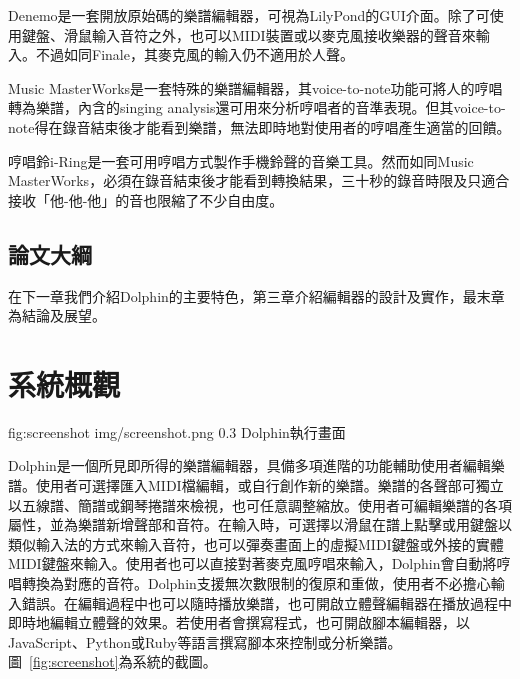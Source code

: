 \documentclass[12pt,a4paper,oneside]{report}
\begin{document}
Denemo\cite{denemo}是一套開放原始碼的樂譜編輯器，可視為LilyPond\cite{lilypond}的GUI介面。除了可使用鍵盤、滑鼠輸入音符之外，也可以MIDI裝置或以麥克風接收樂器的聲音來輸入。不過如同Finale，其麥克風的輸入仍不適用於人聲。

Music MasterWorks\cite{musicMasterWorks}是一套特殊的樂譜編輯器，其voice-to-note功能可將人的哼唱轉為樂譜，內含的singing analysis還可用來分析哼唱者的音準表現。但其voice-to-note得在錄音結束後才能看到樂譜，無法即時地對使用者的哼唱產生適當的回饋。

哼唱鈴i-Ring\cite{iring}是一套可用哼唱方式製作手機鈴聲的音樂工具。然而如同Music MasterWorks，必須在錄音結束後才能看到轉換結果，三十秒的錄音時限及只適合接收「他-他-他」的音也限縮了不少自由度。

\section{論文大綱} %

在下一章我們介紹Dolphin的主要特色，第三章介紹編輯器的設計及實作，最末章為結論及展望。

\chapter{系統概觀} %


\figurewithcaption
{fig:screenshot}
{img/screenshot.png}
{0.3}
{Dolphin執行畫面}

Dolphin是一個所見即所得的樂譜編輯器，具備多項進階的功能輔助使用者編輯樂譜。使用者可選擇匯入MIDI檔編輯，或自行創作新的樂譜。樂譜的各聲部可獨立以五線譜、簡譜或鋼琴捲譜來檢視，也可任意調整縮放。使用者可編輯樂譜的各項屬性，並為樂譜新增聲部和音符。在輸入時，可選擇以滑鼠在譜上點擊或用鍵盤以類似輸入法的方式來輸入音符，也可以彈奏畫面上的虛擬MIDI鍵盤或外接的實體MIDI鍵盤來輸入。使用者也可以直接對著麥克風哼唱來輸入，Dolphin會自動將哼唱轉換為對應的音符。Dolphin支援無次數限制的復原和重做，使用者不必擔心輸入錯誤。在編輯過程中也可以隨時播放樂譜，也可開啟立體聲編輯器在播放過程中即時地編輯立體聲的效果。若使用者會撰寫程式，也可開啟腳本編輯器，以JavaScript、Python或Ruby等語言撰寫腳本來控制或分析樂譜。圖~\ref{fig:screenshot}為系統的截圖。
\end{document}
